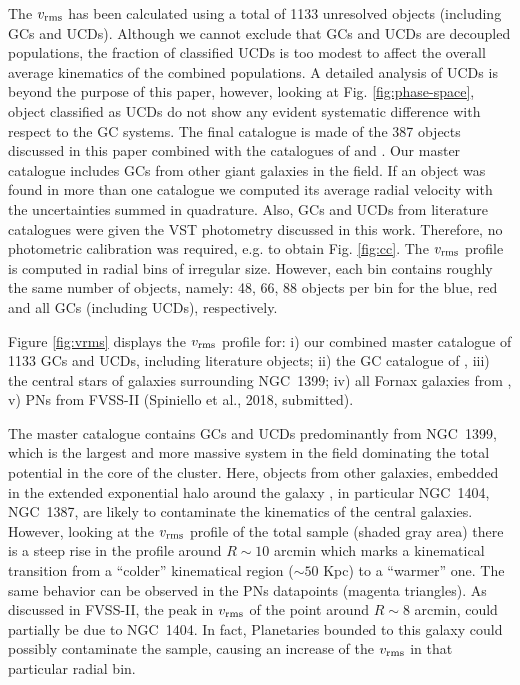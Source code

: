 \documentclass[useAMS,usenatbib]{mn2e}
\begin{document}
The $v_{\rm rms}$ has been calculated using a total of 1133 unresolved objects 
(including GCs and UCDs). Although we cannot exclude that GCs and UCDs are 
decoupled populations, 
the fraction of classified UCDs is too modest to affect the overall average 
kinematics of the combined populations. A detailed analysis of UCDs is beyond 
the purpose of this paper,
however, looking at Fig. \ref{fig:phase-space}, object classified as UCDs do 
not show any evident systematic difference with respect to the GC systems. 
The final catalogue is made of the 387 objects discussed in this paper 
combined with the catalogues of \citet{Bergond07} and \citet{Schuberth}. Our master catalogue
includes GCs from other giant galaxies in the field. If an 
object was found in more than one catalogue we computed its average radial 
velocity with the uncertainties summed in quadrature. Also, GCs and UCDs from 
literature catalogues were given the VST photometry discussed in this work. 
Therefore, no photometric calibration was required, e.g. to obtain Fig. 
\ref{fig:cc}. The $v_{\rm rms}$ profile is computed in radial bins of irregular 
size. However, each bin contains roughly the same number of objects, namely: 
48, 66, 88 objects per bin for the blue, red and all GCs (including UCDs), respectively. 

Figure \ref{fig:vrms} displays the $v_{\rm rms}$ profile for: i) our combined master 
catalogue of 1133 GCs and UCDs, including literature objects; ii) the GC catalogue of 
\citet{Schuberth}, iii) the central stars of galaxies surrounding NGC~1399; iv) 
all Fornax galaxies from \citet{Drinkwater00}, v) PNs from FVSS-II (Spiniello et al., 2018, submitted).

The master catalogue contains GCs and UCDs predominantly from NGC~1399, which 
is the largest and more massive system in the field dominating the total 
potential in the core of the cluster. Here, objects from other galaxies, 
embedded in the extended exponential halo around the galaxy \citep{Iodice16}, 
in particular NGC~1404, NGC~1387, are likely to contaminate the 
kinematics of the central galaxies. However, looking at the $v_{\rm rms}$ 
profile of the total sample (shaded gray area) there is a steep rise in the 
profile around $R\sim10$ arcmin which marks a kinematical transition from a 
``colder'' kinematical region ($\sim 50$ Kpc) to a ``warmer'' one. 
The same behavior can be observed in the PNs datapoints 
(magenta triangles). As discussed in FVSS-II, the peak in $v_{\rm rms}$ 
of the point around $R\sim 8$ arcmin, could partially be due to NGC~1404. 
In fact, Planetaries bounded to this galaxy could possibly contaminate the sample, 
causing an increase of the $v_{\rm rms}$ in that particular radial bin.
\end{document}
